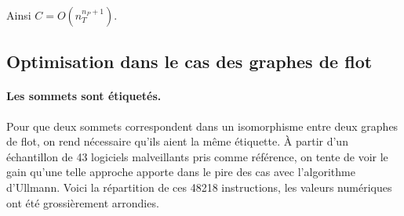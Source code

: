 \begin{pr}
Ainsi $C=O(n_T^{n_P+1})$.
\end{pr}



\subsection{Optimisation dans le cas des graphes de flot\label{sec:ullmann_optimisation}}
\paragraph{Les sommets sont étiquetés.}
Pour que deux sommets correspondent dans un isomorphisme entre deux graphes de flot, on rend nécessaire qu'ils aient la même étiquette.
À partir d'un échantillon de 43 logiciels malveillants pris comme référence, on tente de voir le gain qu'une telle approche apporte dans le pire des cas avec l'algorithme d'Ullmann.
Voici la répartition de ces 48218 instructions, les valeurs numériques ont été grossièrement arrondies.

